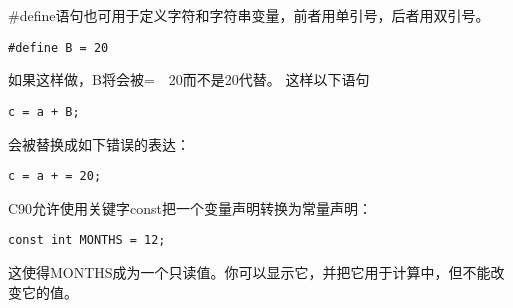 \begin{frame}[fragile]
\#define语句也可用于定义字符和字符串变量，前者用单引号，后者用双引号。
\vspace{0.1in} \pause 

\begin{lstlisting}[title=常见错误]
#define B = 20
\end{lstlisting}
\vspace{0.1in}

如果这样做，B将会被=~~20而不是20代替。 这样以下语句
\begin{lstlisting}
c = a + B;
\end{lstlisting}
会被替换成如下错误的表达：
\begin{lstlisting}
c = a + = 20;
\end{lstlisting}
\end{frame}

\begin{frame}[fragile]
C90允许使用关键字const把一个变量声明转换为常量声明：
\begin{lstlisting}
const int MONTHS = 12; 
\end{lstlisting}
这使得MONTHS成为一个只读值。你可以显示它，并把它用于计算中，但不能改变它的值。
\end{frame}
